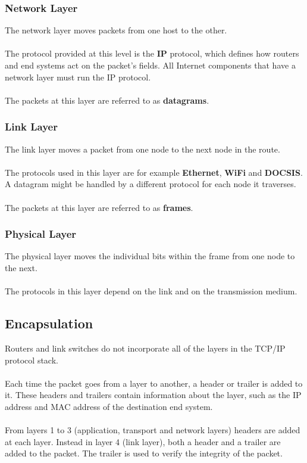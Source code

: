 \documentclass{article}
\begin{document}
\subsubsection{Network Layer}
The network layer moves packets from one host to the other. \\ \\
The protocol provided at this level is the \textbf{IP} protocol, which defines how routers and end systems act on the packet's fields. All Internet components that have a network layer must run the IP protocol. \\ \\
The packets at this layer are referred to as \textbf{datagrams}.

\subsubsection{Link Layer}
The link layer moves a packet from one node to the next node in the route. \\ \\
The protocols used in this layer are for example \textbf{Ethernet}, \textbf{WiFi} and \textbf{DOCSIS}. A datagram might be handled by a different protocol for each node it traverses. \\ \\
The packets at this layer are referred to as \textbf{frames}.

\subsubsection{Physical Layer}
The physical layer moves the individual bits within the frame from one node to the next. \\ \\
The protocols in this layer depend on the link and on the transmission medium.

\subsection{Encapsulation}
Routers and link switches do not incorporate all of the layers in the TCP/IP protocol stack. \\ \\
Each time the packet goes from a layer to another, a header or trailer is added to it. These headers and trailers contain information about the layer, such as the IP address and MAC address of the destination end system. \\ \\
From layers 1 to 3 (application, transport and network layers) headers are added at each layer. Instead in layer 4 (link layer), both a header and a trailer are added to the packet. The trailer is used to verify the integrity of the packet.
\end{document}
